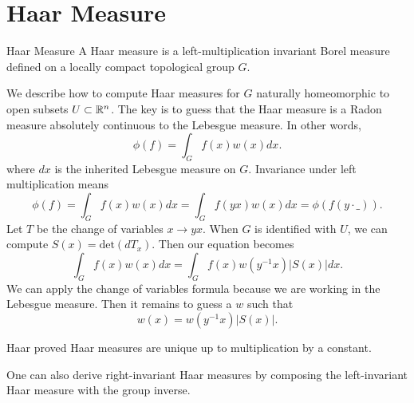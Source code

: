 

\pagestyle{fancy}
\section{Haar Measure}
\begin{dfn}{Haar Measure}
A Haar measure is a left-multiplication invariant Borel measure defined on a locally compact topological group $G$. 
\end{dfn}
We describe how to compute Haar measures for $G$ naturally homeomorphic to open subsets $U \subset {\mathbb R}^n$. The key is to guess that the Haar measure is a Radon measure absolutely continuous to the Lebesgue measure. In other words,
\[
    \phi(f) = \int_G f(x)w(x)dx.
\]
where $dx$ is the inherited Lebesgue measure on $G$. Invariance under left multiplication means
\[
    \phi(f) = \int_G f(x)w(x)dx = \int_G f(yx)w(x)dx = \phi(f(y\cdot \_)).
\]
Let $T$ be the change of variables $x \rightarrow yx$. When $G$ is identified with $U$, we can compute $S(x) = \text{det}(dT_x)$. Then our equation becomes
\[
    \int_G f(x)w(x)dx = \int_G f(x)w(y^{-1}x)|S(x)|dx.
\]
We can apply the change of variables formula because we are working in the Lebesgue measure. Then it remains to guess a $w$ such that
\[
    w(x) = w(y^{-1}x)|S(x)|.
\]
\begin{remark}
    Haar proved Haar measures are unique up to multiplication by a constant.
\end{remark}
\begin{remark}
    One can also derive right-invariant Haar measures by composing the left-invariant Haar measure with the group inverse.
\end{remark}

